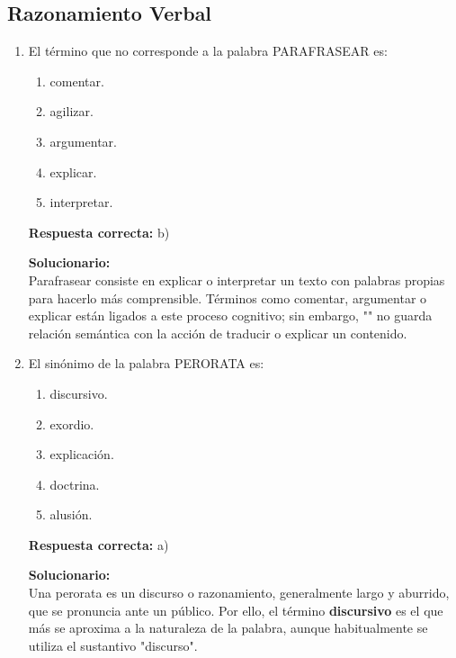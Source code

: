 \subsection*{Razonamiento Verbal}

\begin{enumerate}
	
\item El término que no corresponde a la palabra PARAFRASEAR es:

\begin{enumerate}[label=\alph*)]
	\item comentar.
	\item agilizar.
	\item argumentar.
	\item explicar.
	\item interpretar.
\end{enumerate}

\textbf{Respuesta correcta:} b)

\vspace{2mm}
\textbf{Solucionario:}\\
Parafrasear consiste en explicar o interpretar un texto con palabras propias para hacerlo más comprensible. Términos como comentar, argumentar o explicar están ligados a este proceso cognitivo; sin embargo, "" no guarda relación semántica con la acción de traducir o explicar un contenido.

\vspace{6mm}

\item El sinónimo de la palabra PERORATA es:

\begin{enumerate}[label=\alph*)]
	\item discursivo.
	\item exordio.
	\item explicación.
	\item doctrina.
	\item alusión.
\end{enumerate}

\textbf{Respuesta correcta:} a)

\vspace{2mm}
\textbf{Solucionario:}\\
Una perorata es un discurso o razonamiento, generalmente largo y aburrido, que se pronuncia ante un público. Por ello, el término \textbf{discursivo} es el que más se aproxima a la naturaleza de la palabra, aunque habitualmente se utiliza el sustantivo "discurso".


\end{enumerate}
